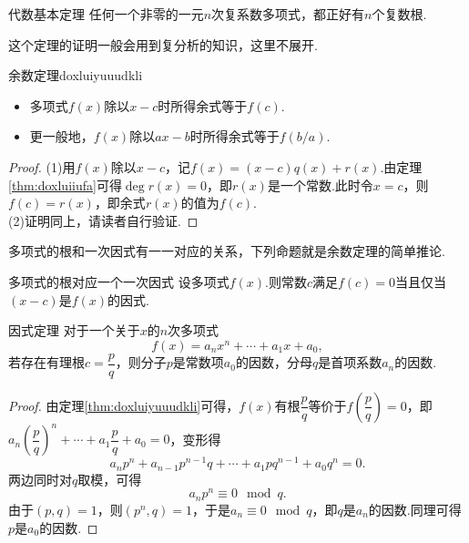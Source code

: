 \documentclass[lang=cn, zihao=5]{elegantbook}
\newcommand{\ssb}[1]{\left( #1 \right)}
\begin{document}
\begin{theorem}{代数基本定理}
	任何一个非零的一元$n$次复系数多项式，都正好有$n$个复数根.
\end{theorem}
\begin{remark}
	这个定理的证明一般会用到复分析的知识，这里不展开.
\end{remark}

\begin{theorem}{余数定理}{doxluiyuuudkli}
	\begin{itemize}
		\item 多项式$f(x)$除以$x-c$时所得余式等于$f(c)$.
		\item 更一般地，$f(x)$除以$ax-b$时所得余式等于$f(b/a)$.
	\end{itemize}
\end{theorem}
\begin{proof}
	(1)用$f(x)$除以$x-c$，记$f(x)=(x-c)q(x)+r(x)$.由定理\ref{thm:doxluiiufa}可得$\deg r(x) =0$，即$r(x)$是一个常数.此时令$x=c$，则$f(c)=r(x)$，即余式$r(x)$的值为$f(c)$. \\
	(2)证明同上，请读者自行验证.
\end{proof}

多项式的根和一次因式有一一对应的关系，下列命题就是余数定理的简单推论.
\begin{proposition}{多项式的根对应一个一次因式}
	设多项式$f(x)$.则常数$c$满足$f(c)=0$当且仅当$(x-c)$是$f(x)$的因式.
\end{proposition}

\begin{theorem}{因式定理}
    对于一个关于$x$的$n$次多项式$$f(x)=a_nx^n+ \cdots +a_1x+a_0,$$若存在有理根$c=\dfrac{p}{q}$，则分子$p$是常数项$a_0$的因数，分母$q$是首项系数$a_n$的因数.
\end{theorem}
\begin{proof}
	由定理\ref{thm:doxluiyuuudkli}可得，$f(x)$有根$\dfrac{p}{q}$等价于$f\ssb{\dfrac{p}{q}}=0$，即
	$a_n \ssb{\dfrac{p}{q}}^n + \cdots + a_1 \dfrac{p}{q} + a_0 = 0$，变形得
	$$a_np^n + a_{n-1}p^{n-1}q + \cdots + a_1pq^{n-1} + a_0q^n = 0.$$
	两边同时对$q$取模，可得$$a_np^n \equiv 0 \mod q.$$
	由于$(p,q)=1$，则$(p^n,q)=1$，于是$a_n \equiv 0 \mod q$，即$q$是$a_n$的因数.同理可得$p$是$a_0$的因数.
\end{proof}
\end{document}
